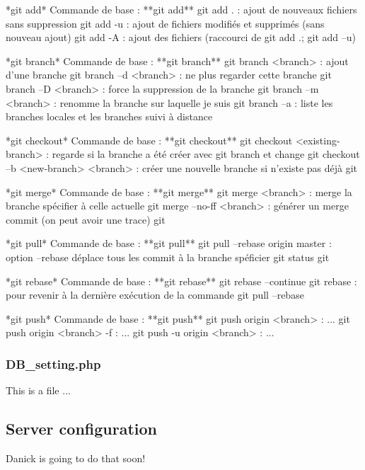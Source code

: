 \begin{DoxyPre}*git add*
Commande de base : **git add**
git add . : ajout de nouveaux fichiers sans suppression
git add -u : ajout de fichiers modifiés et supprimés (sans nouveau ajout) 
git add -A : ajout des fichiers (raccourci de git add .; git add –u)\end{DoxyPre}



\begin{DoxyPre}*git branch*
Commande de base : **git branch**
git branch <branch> : ajout d’une branche
git branch –d <branch> : ne plus regarder cette branche 
git branch –D <branch> : force la suppression de la branche
git branch –m <branch> : renomme la branche sur laquelle je suis
git branch –a : liste les branches locales et les branches suivi à distance\end{DoxyPre}



\begin{DoxyPre}*git checkout*
Commande de base : **git checkout**
git checkout <existing-branch> : regarde si la branche a été créer avec git branch et change
git checkout –b <new-branch> <branch> : créer une nouvelle branche si n’existe pas déjà
git\end{DoxyPre}



\begin{DoxyPre}*git merge*
Commande de base : **git merge**
git merge <branch> : merge la branche spécifier à celle actuelle
git merge –no-ff <branch> : générer un merge commit (on peut avoir une trace)
git\end{DoxyPre}



\begin{DoxyPre}*git pull*
Commande de base : **git pull**
git pull --rebase origin master : option --rebase déplace tous les commit à la branche spéficier
git status
git\end{DoxyPre}



\begin{DoxyPre}*git rebase*
Commande de base : **git rebase**
git rebase --continue
git rebase : pour revenir à la dernière exécution de la commande git pull –rebase\end{DoxyPre}



\begin{DoxyPre}*git push*
Commande de base : **git push**
git push origin <branch> : ...
git push origin <branch> -f : ... 
git push -u origin <branch> : ...
\end{DoxyPre}


\subsubsection*{D\+B\+\_\+setting.\+php}

This is a file ...

\subsection*{Server configuration}

Danick is going to do that soon! 
